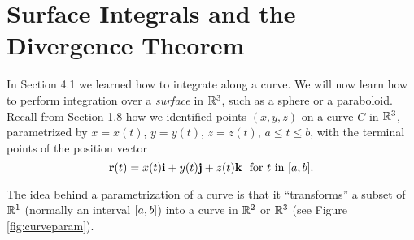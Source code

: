 \section{Surface Integrals and the Divergence Theorem}
In Section 4.1 we learned how to integrate along a curve. We will now learn how to perform integration over a
\emph{surface} in $\mathbb{R}^{3}$, such as a sphere or a paraboloid.
Recall from Section 1.8 how we identified points $(x,y,z)$ on a curve $C$ in $\mathbb{R}^{3}$,
parametrized by $x=x(t)$, $y=y(t)$, $z=z(t)$, $a \le t \le b$, with the terminal points of the position vector
\begin{displaymath}
 \textbf{r}(t) = x(t) \textbf{i} + y(t) \textbf{j} + z(t) \textbf{k} ~~\text{for $t$ in $\lbrack a,b \rbrack$.}
\end{displaymath}

The idea behind a parametrization of a curve is that it ``transforms'' a subset of $\mathbb{R}^{1}$ (normally an interval
$\lbrack a,b \rbrack$) into a curve in $\mathbb{R}^{2}$ or $\mathbb{R}^{3}$ (see Figure \ref{fig:curveparam}).

